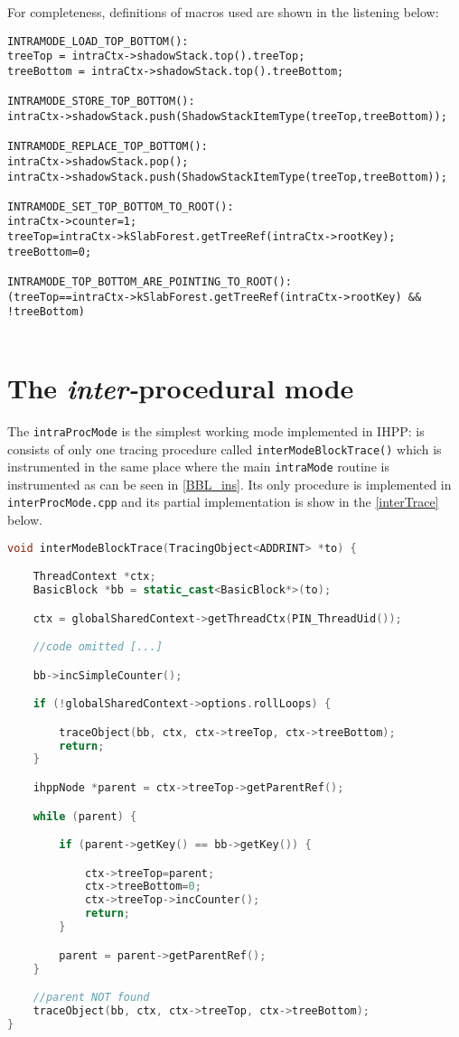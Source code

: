 \documentclass[a4paper,10pt]{report}
\begin{document}
\noindent
For completeness, definitions of macros used are shown in the listening below:

\begin{lstlisting}[caption={partial implementation of \texttt{intraMode\_ret()}},
	label=intraMacros, frame=leftline, showstringspaces=false]
INTRAMODE_LOAD_TOP_BOTTOM():
treeTop = intraCtx->shadowStack.top().treeTop;
treeBottom = intraCtx->shadowStack.top().treeBottom;

INTRAMODE_STORE_TOP_BOTTOM():
intraCtx->shadowStack.push(ShadowStackItemType(treeTop,treeBottom));

INTRAMODE_REPLACE_TOP_BOTTOM():
intraCtx->shadowStack.pop();
intraCtx->shadowStack.push(ShadowStackItemType(treeTop,treeBottom));

INTRAMODE_SET_TOP_BOTTOM_TO_ROOT():
intraCtx->counter=1;
treeTop=intraCtx->kSlabForest.getTreeRef(intraCtx->rootKey);
treeBottom=0;

INTRAMODE_TOP_BOTTOM_ARE_POINTING_TO_ROOT():
(treeTop==intraCtx->kSlabForest.getTreeRef(intraCtx->rootKey) && !treeBottom)


\end{lstlisting}

\section{The \emph{inter-}procedural mode}

The \verb|intraProcMode| is the simplest working mode implemented in IHPP:
is consists of only one tracing procedure called \verb|interModeBlockTrace()|
which is instrumented in the same place where the main \verb|intraMode| routine
is instrumented as can be seen in \cref{BBL_ins}. Its only procedure
is implemented in \verb|interProcMode.cpp| and its partial implementation
is show in the \cref{interTrace} below.

\begin{lstlisting}[language=C++,
	caption={partial implementation of \texttt{interModeBlockTrace}},
	label=interTrace, frame=leftline, showstringspaces=false]
void interModeBlockTrace(TracingObject<ADDRINT> *to) {

	ThreadContext *ctx;
	BasicBlock *bb = static_cast<BasicBlock*>(to);

	ctx = globalSharedContext->getThreadCtx(PIN_ThreadUid());

	//code omitted [...]

	bb->incSimpleCounter();

	if (!globalSharedContext->options.rollLoops) {

		traceObject(bb, ctx, ctx->treeTop, ctx->treeBottom);
		return;
	}

	ihppNode *parent = ctx->treeTop->getParentRef();

	while (parent) {

		if (parent->getKey() == bb->getKey()) {

			ctx->treeTop=parent;
			ctx->treeBottom=0;
			ctx->treeTop->incCounter();
			return;
		}

		parent = parent->getParentRef();
	}

	//parent NOT found
	traceObject(bb, ctx, ctx->treeTop, ctx->treeBottom);
}
\end{lstlisting}
\end{document}
